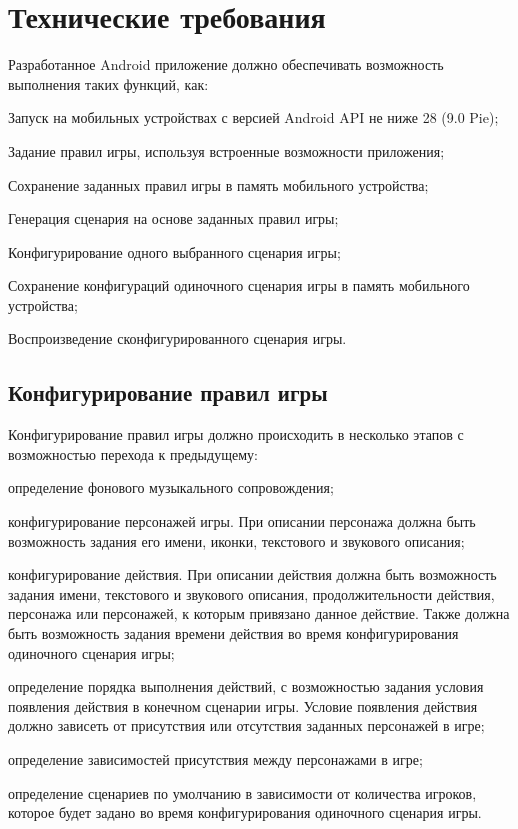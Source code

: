 \section{Технические требования}

Разработанное Android приложение должно обеспечивать возможность выполнения таких функций, как:

\begin{itemize*}
    \item Запуск на мобильных устройствах с версией Android API не ниже 28 (9.0 Pie);
    \item Задание правил игры, используя встроенные возможности приложения;
    \item Сохранение заданных правил игры в память мобильного устройства;
    \item Генерация сценария на основе заданных правил игры;
    \item Конфигурирование одного выбранного сценария игры;
    \item Сохранение конфигураций одиночного сценария игры в память мобильного устройства;
    \item Воспроизведение сконфигурированного сценария игры.
\end{itemize*}

\subsection{Конфигурирование правил игры}

Конфигурирование правил игры должно происходить в несколько этапов с возможностью перехода к предыдущему: 

\begin{enumerate*}
    \item определение фонового музыкального сопровождения;
    \item конфигурирование персонажей игры. При описании персонажа должна быть возможность задания его имени, иконки, текстового и звукового описания;
    \item конфигурирование действия. При описании действия должна быть возможность задания имени, текстового и звукового описания, продолжительности действия, персонажа или персонажей, к которым привязано данное действие. Также должна быть возможность задания времени действия во время конфигурирования одиночного сценария игры;
    \item определение порядка выполнения действий, с возможностью задания условия появления действия в конечном сценарии игры. Условие появления действия должно зависеть от присутствия или отсутствия заданных персонажей в игре;
    \item определение зависимостей присутствия между персонажами в игре;
    \item определение сценариев по умолчанию в зависимости от количества игроков, которое будет задано во время конфигурирования одиночного сценария игры.
\end{enumerate*}

